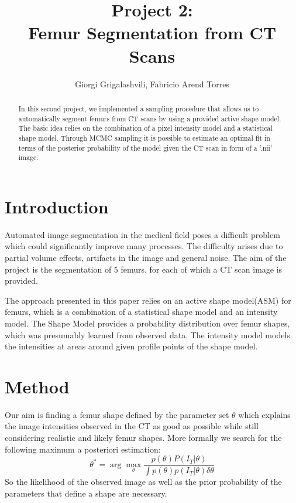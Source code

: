 \documentclass{article}
\begin{document}
	\author{Giorgi Grigalashvili, Fabricio Arend Torres}
		\title{Project 2:\\ Femur Segmentation from CT Scans}
	\maketitle
	\begin{abstract}
		In this second project, we implemented a sampling procedure that allows us to automatically segment femurs from CT scans by using a provided active shape model.
		The basic idea relies on the combination of a pixel intensity model and a statistical shape model.
		Through MCMC sampling it is possible to estimate an optimal fit in terms of the posterior probability of the model given the CT scan in form of a '.nii' image.
	\end{abstract}
	

	\section{Introduction}
	Automated image segmentation in the medical field poses a difficult problem which could significantly improve many processes.
	The difficulty arises due to partial volume effects, artifacts in the image and general noise.
	The aim of the project is the segmentation of 5 femurs, for each of which a CT scan image is provided. 
		
	The approach presented in this paper relies on an active shape model(ASM) for femurs, which is a combination of a statistical shape model and an intensity model.
	The Shape Model provides a probability distribution over femur shapes, which was presumably learned from observed data.
	The intensity model models the intensities at areas around given profile points of the shape model.	


	\section{Method}
	Our aim is finding a femur shape defined by the parameter set $\theta$ which explains the image intensities observed in the CT as good as possible while still considering realistic and likely femur shapes.
	More formally we search for the following maximum a posteriori estimation:
	\begin{equation}
	\theta^* = \arg\max_\theta \frac{p(\theta) P(I_T | \theta)}{\int p(\theta) p(I_T | \theta) \delta\theta}
	\end{equation}	
	So the likelihood of the observed image as well as the prior probability of the parameters that define a shape are necessary.
	
\end{document}
